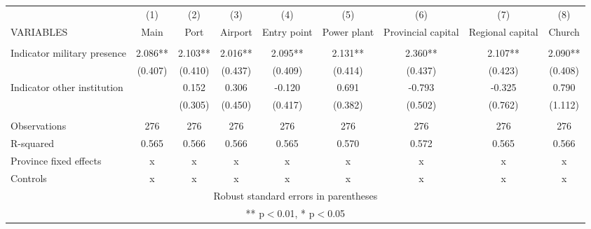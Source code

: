 \begin{tabular}{lcccccccc} \hline
 & (1) & (2) & (3) & (4) & (5) & (6) & (7) & (8) \\
VARIABLES & Main & Port & Airport & Entry point & Power plant & Provincial capital & Regional capital & Church \\ \hline
 &  &  &  &  &  &  &  &  \\
Indicator military presence & 2.086** & 2.103** & 2.016** & 2.095** & 2.131** & 2.360** & 2.107** & 2.090** \\
 & (0.407) & (0.410) & (0.437) & (0.409) & (0.414) & (0.437) & (0.423) & (0.408) \\
Indicator other institution &  & 0.152 & 0.306 & -0.120 & 0.691 & -0.793 & -0.325 & 0.790 \\
 &  & (0.305) & (0.450) & (0.417) & (0.382) & (0.502) & (0.762) & (1.112) \\
 &  &  &  &  &  &  &  &  \\
Observations & 276 & 276 & 276 & 276 & 276 & 276 & 276 & 276 \\
R-squared & 0.565 & 0.566 & 0.566 & 0.565 & 0.570 & 0.572 & 0.565 & 0.566 \\
Province fixed effects & x & x & x & x & x & x & x & x \\
 Controls & x & x & x & x & x & x & x & x \\ \hline
\multicolumn{9}{c}{ Robust standard errors in parentheses} \\
\multicolumn{9}{c}{ ** p$<$0.01, * p$<$0.05} \\
\end{tabular}
